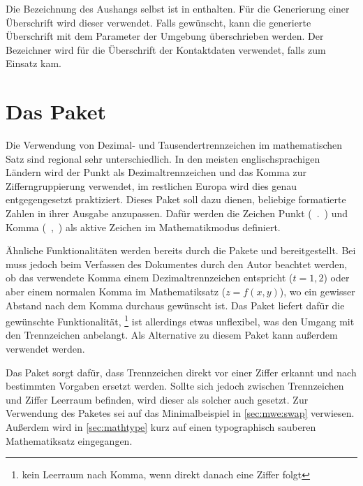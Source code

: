 \documentclass[%
  english,ngerman,%
  headings=optiontoheadandtoc,captions=tableheading,numbers=noenddot,%
  chapterpage,cdfoot,%
]{tudscrman}
\begin{document}
\begin{Declaration}{}
\begin{Declaration}{}
\printdeclarationlist%
Die Bezeichnung des Aushangs selbst ist in  enthalten. Für die 
Generierung einer Überschrift wird dieser verwendet. Falls gewünscht, kann die 
generierte Überschrift mit dem Parameter  
der Umgebung  überschrieben werden. Der Bezeichner 
 wird für die Überschrift der Kontaktdaten verwendet, falls 
 zum Einsatz kam.
\end{Declaration}
\end{Declaration}


\section{Das Paket }
Die Verwendung von Dezimal- und Tausendertrennzeichen im mathematischen Satz 
sind regional sehr unterschiedlich. In den meisten englischsprachigen Ländern 
wird der Punkt als Dezimaltrennzeichen und das Komma zur Zifferngruppierung 
verwendet, im restlichen Europa wird dies genau entgegengesetzt praktiziert.
Dieses Paket soll dazu dienen, beliebige formatierte Zahlen in ihrer Ausgabe 
anzupassen. Dafür werden die Zeichen Punkt (\ .\ ) und Komma (\ ,\ ) als 
aktive Zeichen im Mathematikmodus definiert.

Ähnliche Funktionalitäten werden bereits durch die Pakete  und 
 bereitgestellt. Bei  muss jedoch beim
Verfassen des Dokumentes durch den Autor beachtet werden, ob das verwendete
Komma einem Dezimaltrennzeichen entspricht ($t=1,\!2$) oder aber einem
normalen Komma im Mathematiksatz ($z=f(x,y)$), wo ein gewisser Abstand nach
dem Komma durchaus gewünscht ist. Das Paket  liefert dafür die
gewünschte Funktionalität,%
\footnote{kein Leerraum nach Komma, wenn direkt danach eine Ziffer folgt}
ist allerdings etwas unflexibel, was den Umgang mit den Trennzeichen anbelangt.
Als Alternative zu diesem Paket kann außerdem  verwendet 
werden.

Das Paket  sorgt dafür, dass Trennzeichen direkt vor einer 
Ziffer erkannt und nach bestimmten Vorgaben ersetzt werden. Sollte sich jedoch 
zwischen Trennzeichen und Ziffer Leerraum befinden, wird dieser als solcher
auch gesetzt. Zur Verwendung des Paketes sei auf das Minimalbeispiel in 
\autoref{sec:mwe:swap} verwiesen. Außerdem wird in \autoref{sec:mathtype} kurz 
auf einen typographisch sauberen Mathematiksatz eingegangen.
\end{document}
